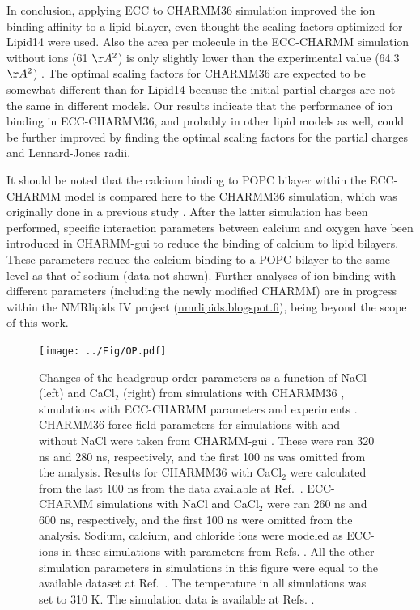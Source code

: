 \documentclass[journal=jpcbfk]{achemso}
\begin{document}
In conclusion, applying ECC to CHARMM36 simulation
improved the ion binding affinity to a lipid bilayer, even thought the
scaling factors optimized for Lipid14 were used. Also the area per molecule in
the ECC-CHARMM simulation without ions (61 $\AA^2$) is only slightly
lower than the experimental value (64.3 $\AA^2$) \cite{kucerka11}. 
The optimal scaling factors for CHARMM36 are expected to be somewhat different
than for Lipid14 because the initial partial charges are not the same
in different models. Our results indicate that the performance of ion
binding in ECC-CHARMM36, and probably in other lipid models as well, could
be further improved by finding the optimal scaling factors for the partial
charges and Lennard-Jones radii.

It should be noted that the calcium binding to POPC bilayer within the ECC-CHARMM model
is compared here to the CHARMM36 simulation, which was originally done in a 
previous study \cite{catte16,charmmPOPC450mMCaClfiles}.
After the latter simulation has been performed, specific interaction parameters
between calcium and oxygen \cite{kim16} have been introduced in CHARMM-gui
to reduce the binding of calcium to lipid bilayers. These parameters
reduce the calcium binding to a POPC bilayer to the same level as that of sodium (data not shown).
Further analyses of ion binding with different parameters (including the newly modified CHARMM) are in progress
within the NMRlipids IV project (\url{nmrlipids.blogspot.fi}), being beyond the scope of this work. 


\begin{figure}[!h]
  \centering
  \texttt{[image: ../Fig/OP.pdf]}
  \caption{\label{scaledCHARMM}
    Changes of the headgroup order parameters as a function of NaCl (left) and CaCl$_2$ (right)
    from simulations with CHARMM36 \cite{klauda10}, simulations with ECC-CHARMM parameters and experiments \cite{akutsu81,altenbach84}. 
    CHARMM36 force field parameters for simulations with and without NaCl were taken from CHARMM-gui \cite{lee15}.
    These were ran 320 ns and 280 ns, respectively, and the first 100 ns was omitted from the analysis.
    Results for CHARMM36 with CaCl$_2$ were calculated from the last 100 ns from the data available at Ref.~.
    ECC-CHARMM simulations with NaCl and CaCl$_2$ were ran 260 ns and 600 ns, respectively, and the first 100 ns were omitted from the analysis.
    Sodium, calcium, and chloride ions were modeled as ECC-ions in these simulations with parameters from Refs. .
    All the other simulation parameters in simulations in this figure were equal to the available dataset at Ref.~.
    The temperature in all simulations was set to 310 K.
    The simulation data is available at Refs. .
  }
\end{figure}
\end{document}
